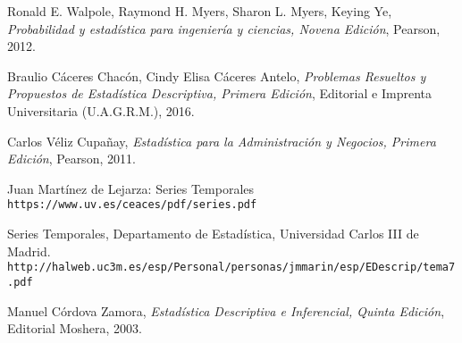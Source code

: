 

\begin{thebibliography}{9}
Ronald E. Walpole, Raymond H. Myers, Sharon L. Myers, Keying Ye, \textit{Probabilidad y estadística para ingeniería y ciencias, Novena Edición}, Pearson, 2012. 
 
Braulio Cáceres Chacón, Cindy Elisa Cáceres Antelo, \textit{Problemas Resueltos y Propuestos de Estadística Descriptiva, Primera Edición}, Editorial e Imprenta Universitaria (U.A.G.R.M.), 2016.

Carlos Véliz Cupañay, \textit{Estadística para la Administración y Negocios, Primera Edición}, Pearson, 2011. 
 
Juan Martínez de Lejarza: Series Temporales
\\\texttt{https://www.uv.es/ceaces/pdf/series.pdf}

Series Temporales, Departamento de Estadística, Universidad Carlos III de Madrid.
\\\texttt{http://halweb.uc3m.es/esp/Personal/personas/jmmarin/esp/EDescrip/tema7.pdf}

Manuel Córdova Zamora, \textit{Estadística Descriptiva e Inferencial, Quinta Edición}, Editorial Moshera, 2003. 


\end{thebibliography}

